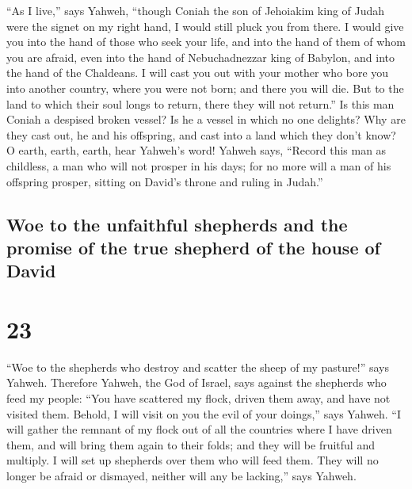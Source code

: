  ``As I live,'' says Yahweh, ``though Coniah the son of
Jehoiakim king of Judah were the signet on my right hand, I would still
pluck you from there.  I would give you into the hand of
those who seek your life, and into the hand of them of whom you are
afraid, even into the hand of Nebuchadnezzar king of Babylon, and into
the hand of the Chaldeans.  I will cast you out with your
mother who bore you into another country, where you were not born; and
there you will die.  But to the land to which their soul
longs to return, there they will not return.''  Is this
man Coniah a despised broken vessel? Is he a vessel in which no one
delights? Why are they cast out, he and his offspring, and cast into a
land which they don't know?  O earth, earth, earth, hear
Yahweh's word!  Yahweh says, ``Record this man as
childless, a man who will not prosper in his days; for no more will a
man of his offspring prosper, sitting on David's throne and ruling in
Judah.''

\hypertarget{woe-to-the-unfaithful-shepherds-and-the-promise-of-the-true-shepherd-of-the-house-of-david}{%
\subsection{Woe to the unfaithful shepherds and the promise of the true
shepherd of the house of
David}\label{woe-to-the-unfaithful-shepherds-and-the-promise-of-the-true-shepherd-of-the-house-of-david}}

\hypertarget{section-22}{%
\section{23}\label{section-22}}

 ``Woe to the shepherds who destroy and scatter the sheep
of my pasture!'' says Yahweh.  Therefore Yahweh, the God
of Israel, says against the shepherds who feed my people: ``You have
scattered my flock, driven them away, and have not visited them. Behold,
I will visit on you the evil of your doings,'' says Yahweh.
 ``I will gather the remnant of my flock out of all the
countries where I have driven them, and will bring them again to their
folds; and they will be fruitful and multiply.  I will set
up shepherds over them who will feed them. They will no longer be afraid
or dismayed, neither will any be lacking,'' says Yahweh.

